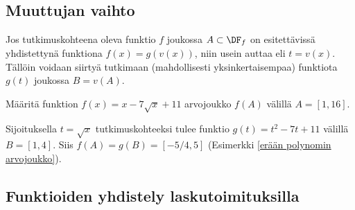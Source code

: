 \subsection{Muuttujan vaihto}

Jos tutkimuskohteena oleva funktio $f$ joukossa $A\subset\DF_f$ on esitettävissä
yhdistettynä funktiona $f(x)=g(v(x))$, niin usein auttaa  eli
 $t=v(x)$. Tällöin voidaan siirtyä tutkimaan (mahdollisesti yksinkertaisempaa)
funktiota $g(t)$ joukossa $B=v(A)$.
\begin{Exa} Määritä funktion $f(x)=x-7\sqrt{x}+11$ arvojoukko $f(A)$ välillä $A=[1,16]$.
\end{Exa}
\ratk Sijoituksella $t=\sqrt{x}$ tutkimuskohteeksi tulee funktio $g(t)=t^2-7t+11$ välillä
$B=[1,4]$. Siis $f(A)=g(B)=[-5/4,5]$ (Esimerkki \ref{erään polynomin arvojoukko}). \loppu


\subsection{Funktioiden yhdistely laskutoimituksilla}

